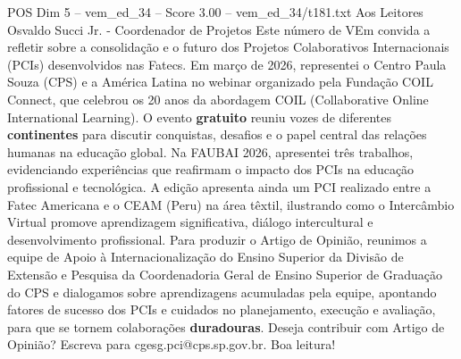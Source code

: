 \begin{textsample}{POS Dim 5 – vem\_ed\_34 – Score 3.00 – vem\_ed\_34/t181.txt}  \label{ex:f5_pos_005}
Aos Leitores Osvaldo Succi Jr. - Coordenador de Projetos Este número de VEm convida a refletir sobre a consolidação e o futuro dos Projetos Colaborativos Internacionais (PCIs) desenvolvidos nas Fatecs.
Em março de 2026, representei o Centro Paula Souza (CPS) e a América Latina no webinar organizado pela Fundação COIL Connect, que celebrou os 20 anos da abordagem COIL (Collaborative Online International Learning).
O evento \textbf{gratuito} reuniu vozes de diferentes \textbf{continentes} para discutir conquistas, desafios e o papel central das relações humanas na educação global.
Na FAUBAI 2026, apresentei três trabalhos, evidenciando experiências que reafirmam o impacto dos PCIs na educação profissional e tecnológica.
A edição apresenta ainda um PCI realizado entre a Fatec Americana e o CEAM (Peru) na área têxtil, ilustrando como o Intercâmbio Virtual promove aprendizagem significativa, diálogo intercultural e desenvolvimento profissional.
Para produzir o Artigo de Opinião, reunimos a equipe de Apoio à Internacionalização do Ensino Superior da Divisão de Extensão e Pesquisa da Coordenadoria Geral de Ensino Superior de Graduação do CPS e dialogamos sobre aprendizagens acumuladas pela equipe, apontando fatores de sucesso dos PCIs e cuidados no planejamento, execução e avaliação, para que se tornem colaborações \textbf{duradouras}.
Deseja contribuir com Artigo de Opinião?
Escreva para cgesg.pci@cps.sp.gov.br.
Boa leitura!

\end{textsample}
